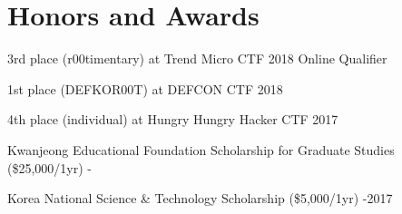 \section*{Honors and Awards}
\begin{description}
  \item 3rd place (r00timentary) at Trend Micro CTF 2018 Online Qualifier

  \item 1st place (DEFKOR00T) at DEFCON CTF 2018

  \item 4th place (individual) at Hungry Hungry Hacker CTF 2017

  \item Kwanjeong Educational Foundation Scholarship for Graduate Studies (\$25,000/1yr) 
  -
  
  \item Korea National Science \& Technology Scholarship (\$5,000/1yr) 
  -2017

\end{description}
